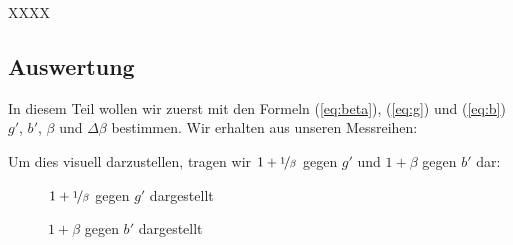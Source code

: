 \documentclass[11pt,a4paper]{article}
\begin{document}
XXXX

\subsection{Auswertung}

In diesem Teil wollen wir zuerst mit den Formeln (\ref{eq:beta}), (\ref{eq:g}) und (\ref{eq:b}) $g'$, $b'$, $\beta$ und $\Delta \beta$ bestimmen. Wir erhalten aus unseren Messreihen:

Um dies visuell darzustellen, tragen wir $1+\nicefrac{1}{\beta}$ gegen $g'$ und $1+\beta$ gegen $b'$ dar:

\begin{figure}[h]
\centering
{}
\renewcommand\thefigure{69}
\caption[$1+\nicefrac{1}{\beta}$ gegen $g'$ dargestellt]{$1+\nicefrac{1}{\beta}$ gegen $g'$ dargestellt}
\label{Abb:g}
\end{figure}

\begin{figure}[h]
\centering
{}
\renewcommand\thefigure{420}
\caption[$1+{\beta}$ gegen $b'$ dargestellt]{$1+\beta$ gegen $b'$ dargestellt}
\label{Abb:b}
\end{figure}
\end{document}
